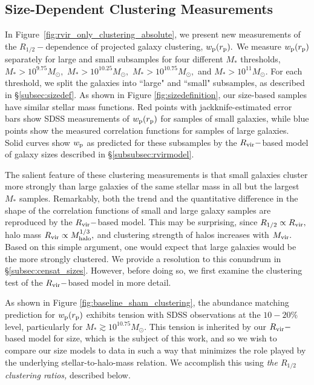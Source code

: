 \documentclass[usenatbib,usegraphicx,letterpaper]{mn2e}
\newcommand{\rhalf}{R_{1/2}}
\newcommand{\mstar}{M_{\ast}}
\newcommand{\mvir}{M_{\rm vir}}
\newcommand{\mhalo}{M_{\rm halo}}
\newcommand{\rvir}{R_{\rm vir}}
\newcommand{\rproj}{r_{\rm p}}
\newcommand{\wproj}{w_{\rm p}}
\newcommand{\msun}{M_\odot}
\begin{document}
\subsection{Size-Dependent Clustering Measurements}
\label{subsec:clustering_results}

In Figure~\ref{fig:rvir_only_clustering_absolute}, we present new measurements of the $\rhalf-$dependence of projected galaxy clustering, $\wproj(\rproj).$ We measure $\wproj(\rproj)$ separately for large and small subsamples for four different $\mstar$ thresholds, $\mstar>10^{9.75}\msun,$ $\mstar>10^{10.25}\msun,$ $\mstar>10^{10.75}\msun,$ and $\mstar>10^{11}\msun.$ For each threshold, we split the galaxies into ``large" and ``small" subsamples, as described in \S\ref{subsec:sizedef}. As shown in Figure \ref{fig:sizedefinition}, our size-based samples  have similar stellar mass functions. Red points with jackknife-estimated error bars show SDSS measurements of $\wproj(\rproj)$ for samples of small galaxies, while blue points show the measured correlation functions for samples of large galaxies. Solid curves show $\wproj$ as predicted for these subsamples by the $\rvir-$based model of galaxy sizes described in \S\ref{subsubsec:rvirmodel}.

The salient feature of these clustering measurements is that small galaxies cluster more strongly than large galaxies of the same stellar mass in all but the largest $\mstar$ samples. Remarkably, both the trend and the quantitative difference in the shape of the correlation functions of small and large galaxy samples are reproduced by the $\rvir-$based model. This may be surprising, since $\rhalf\propto\rvir,$ halo mass $\rvir\propto\mhalo^{1/3},$ and clustering strength of halos increases with $\mvir.$ Based on this simple argument, one would expect that large galaxies would be the more strongly clustered. We provide a resolution to this conundrum in \S\ref{subsec:censat_sizes}. However,  before doing so, we first examine the clustering test of the $\rvir-$based model in more detail.

As shown in Figure \ref{fig:baseline_sham_clustering}, the abundance matching prediction for $\wproj(\rproj)$ exhibits tension with SDSS observations at the $10-20\%$ level, particularly for $\mstar\gtrsim10^{10.75}\msun.$ This tension is inherited by our $\rvir-$based model for size, which is the subject of this work, and so we wish to compare our size models to data in such a way that minimizes the role played by the underlying stellar-to-halo-mass relation. We accomplish this using {\em the $\rhalf$ clustering ratios,} described below.
\end{document}

